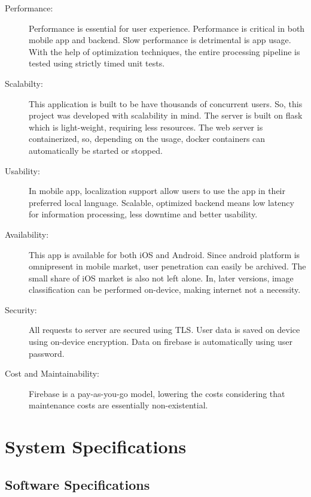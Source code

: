 \documentclass[../Report.tex]{subfiles}
\begin{document}
\begin{description}
  \item[Performance:] Performance is essential for user experience. Performance is critical in both mobile app and backend. Slow performance 
  is detrimental is app usage. With the help of optimization techniques, the entire processing pipeline is tested using strictly timed 
  unit tests.
  
  \item[Scalabilty:] This application is built to be have thousands of concurrent users. So, this project was developed with scalability in 
  mind. The server is built on flask which is light-weight, requiring less resources. The web server is containerized, so, depending on the 
  usage, docker containers can automatically be started or stopped.

  \item[Usability:] In mobile app, localization support allow users to use the app in their preferred local language. Scalable, optimized 
  backend means low latency for information processing, less downtime and better usability.

  \item[Availability:] This app is available for both iOS and Android. Since android platform is omnipresent in mobile market, user 
  penetration can easily be archived. The small share of iOS market is also not left alone. In, later versions, image classification
  can be performed on-device, making internet not a necessity.

  \item[Security:] All requests to server are secured using TLS. User data is saved on device using on-device encryption. Data on 
  firebase is automatically using user password.

  \item[Cost and Maintainability: ] Firebase is a pay-as-you-go model, lowering the costs considering that maintenance costs are 
  essentially non-existential.
\end{description} 

\section{System Specifications}

\subsection{Software Specifications}
\end{document}
